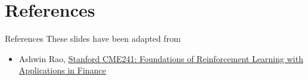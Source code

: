 \section{References}
\begin{frame}{References}
These slides have been adapted from
\begin{itemize}
    \item Ashwin Rao, \href{https://web.stanford.edu/class/cme241/}{Stanford CME241: Foundations of Reinforcement
          Learning with Applications in Finance}
\end{itemize}
\end{frame}

